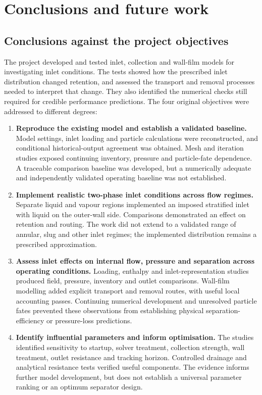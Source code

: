 \section{Conclusions and future work}

\subsection{Conclusions against the project objectives}

The project developed and tested inlet, collection and wall-film models for investigating inlet conditions. The tests showed how the prescribed inlet distribution changed retention, and assessed the transport and removal processes needed to interpret that change. They also identified the numerical checks still required for credible performance predictions. The four original objectives were addressed to different degrees:

\begin{enumerate}
\def\labelenumi{\arabic{enumi}.}
\item
  \textbf{Reproduce the existing model and establish a validated baseline.} Model settings, inlet loading and particle calculations were reconstructed, and conditional historical-output agreement was obtained. Mesh and iteration studies exposed continuing inventory, pressure and particle-fate dependence. A traceable comparison baseline was developed, but a numerically adequate and independently validated operating baseline was not established.
\item
  \textbf{Implement realistic two-phase inlet conditions across flow regimes.} Separate liquid and vapour regions implemented an imposed stratified inlet with liquid on the outer-wall side. Comparisons demonstrated an effect on retention and routing. The work did not extend to a validated range of annular, slug and other inlet regimes; the implemented distribution remains a prescribed approximation.
\item
  \textbf{Assess inlet effects on internal flow, pressure and separation across operating conditions.} Loading, enthalpy and inlet-representation studies produced field, pressure, inventory and outlet comparisons. Wall-film modelling added explicit transport and removal routes, with useful local accounting passes. Continuing numerical development and unresolved particle fates prevented these observations from establishing physical separation-efficiency or pressure-loss predictions.
\item
  \textbf{Identify influential parameters and inform optimisation.} The studies identified sensitivity to startup, solver treatment, collection strength, wall treatment, outlet resistance and tracking horizon. Controlled drainage and analytical resistance tests verified useful components. The evidence informs further model development, but does not establish a universal parameter ranking or an optimum separator design.
\end{enumerate}

